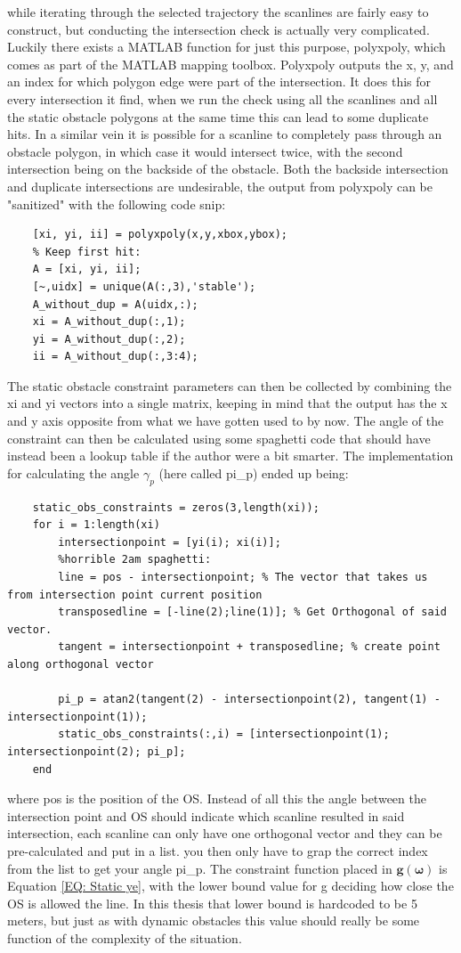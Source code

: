 while iterating through the selected trajectory the scanlines are fairly easy to construct, but conducting the intersection check is actually very complicated. Luckily
there exists a MATLAB function for just this purpose, polyxpoly, which comes as part of the MATLAB mapping toolbox. Polyxpoly outputs the x, y, 
and an index for which polygon edge were part of the intersection. It does this for every intersection it find, when we run the check using all the scanlines
and all the static obstacle polygons at the same time this can lead to some duplicate hits. In a similar vein it is possible for a scanline to completely pass through
an obstacle polygon, in which case it would intersect twice, with the second intersection being on the backside of the obstacle. Both the backside intersection and
duplicate intersections are undesirable, the output from polyxpoly can be "sanitized" with the following code snip:
\begin{lstlisting}
    [xi, yi, ii] = polyxpoly(x,y,xbox,ybox);
    % Keep first hit:
    A = [xi, yi, ii];
    [~,uidx] = unique(A(:,3),'stable');
    A_without_dup = A(uidx,:);
    xi = A_without_dup(:,1);
    yi = A_without_dup(:,2);
    ii = A_without_dup(:,3:4);
\end{lstlisting}
The static obstacle constraint parameters can then be collected by combining the xi and yi vectors into a single matrix, keeping in mind that the output
has the x and y axis opposite from what we have gotten used to by now. The angle of the constraint can then be calculated using some spaghetti code that should
have instead been a lookup table if the author were a bit smarter. The implementation for calculating the angle $\gamma_p$ (here called pi\_p) ended up being:
\begin{lstlisting}
    static_obs_constraints = zeros(3,length(xi));
    for i = 1:length(xi)
        intersectionpoint = [yi(i); xi(i)];
        %horrible 2am spaghetti:
        line = pos - intersectionpoint; % The vector that takes us from intersection point current position
        transposedline = [-line(2);line(1)]; % Get Orthogonal of said vector.
        tangent = intersectionpoint + transposedline; % create point along orthogonal vector
        
        pi_p = atan2(tangent(2) - intersectionpoint(2), tangent(1) - intersectionpoint(1));
        static_obs_constraints(:,i) = [intersectionpoint(1); intersectionpoint(2); pi_p];
    end 
\end{lstlisting}
where pos is the position of the OS. Instead of all this the angle between the intersection point and OS should indicate which scanline resulted
in said intersection, each scanline can only have one orthogonal vector and they can be pre-calculated and put in a list. you then only have to grap the correct index
from the list to get your angle pi\_p. The constraint function placed in $\textbf{g}(\bm{\omega})$ is Equation \eqref{EQ: Static ye}, with the lower
bound value for g deciding how close the \gls{OS} is allowed the line. In this thesis that lower bound is hardcoded to be 5 meters, but just as with dynamic obstacles
this value should really be some function of the complexity of the situation.



